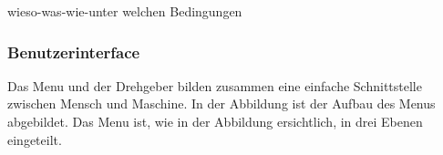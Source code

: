 wieso-was-wie-unter welchen Bedingungen
\subsubsection{Benutzerinterface}
Das Menu und der Drehgeber bilden zusammen eine einfache Schnittstelle zwischen Mensch und Maschine. In der Abbildung  ist der Aufbau des Menus abgebildet. 
Das Menu ist, wie in der Abbildung   ersichtlich, in drei Ebenen eingeteilt.











